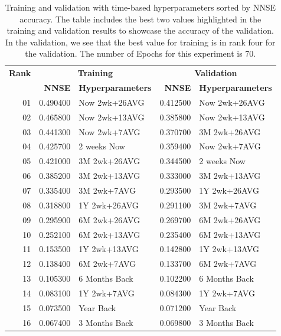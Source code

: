 \documentclass[utf8]{FrontiersinVancouver} %
\begin{document}
\begin{table}[htb]

  \caption{Training and validation with time-based hyperparameters
    sorted by NNSE accuracy. The table includes the best two
    values highlighted in the training and validation results to
    showcase the accuracy of the validation. In the validation,
    we see that the best value for training is in rank four for the
    validation. The number of Epochs for this experiment is 70.}
  \label{tab:training-70}

  \renewcommand{\arraystretch}{1.2}
  \begin{center}
        {\footnotesize
\begin{tabular}{|r|rl||rl|}
  \hline
{\bf Rank} & \multicolumn{2}{c||}{\bfseries Training} & \multicolumn{2}{c|}{\bfseries Validation} \\
     &   {\bf NNSE} & {\bf Hyperparameters} & {\bf NNSE} & {\bf Hyperparameters} \\
              \hline
 01 & \color{red} 0.490400 & \color{red} Now 2wk+26AVG & \color{red} 0.412500 & \color{red} Now 2wk+26AVG \\
 02 & \color{blue} 0.465800 & \color{blue}  Now 2wk+13AVG & \color{blue} 0.385800 & \color{blue} Now 2wk+13AVG \\
 03 & \color{teal} 0.441300 &  \color{teal} Now 2wk+7AVG & 0.370700 & 3M 2wk+26AVG \\
 04 & 0.425700 & 2 weeks Now & \color{teal} 0.359400 & \color{teal} Now 2wk+7AVG \\
 05 & 0.421000 & 3M 2wk+26AVG & 0.344500 & 2 weeks Now \\
 06 & 0.385200 & 3M 2wk+13AVG & 0.333000 & 3M 2wk+13AVG \\
 07 & 0.335400 & 3M 2wk+7AVG & 0.293500 & 1Y 2wk+26AVG \\
 08 & 0.318800 & 1Y 2wk+26AVG & 0.291100 & 3M 2wk+7AVG \\
 09 & 0.295900 & 6M 2wk+26AVG & 0.269700 & 6M 2wk+26AVG \\
 10 & 0.252100 & 6M 2wk+13AVG & 0.235400 & 6M 2wk+13AVG \\
 11 & 0.153500 & 1Y 2wk+13AVG & 0.142800 & 1Y 2wk+13AVG \\
 12 & 0.138400 & 6M 2wk+7AVG & 0.133700 & 6M 2wk+7AVG \\
 13 & 0.105300 & 6 Months Back & 0.102200 & 6 Months Back \\
 14 & 0.083100 & 1Y 2wk+7AVG & 0.084300 & 1Y 2wk+7AVG \\
 15 & 0.073500 & Year Back & 0.071200 & Year Back \\
 16 & 0.067400 & 3 Months Back & 0.069800 & 3 Months Back \\
\hline
\end{tabular}
}
  \end{center}


\end{table}
\end{document}
